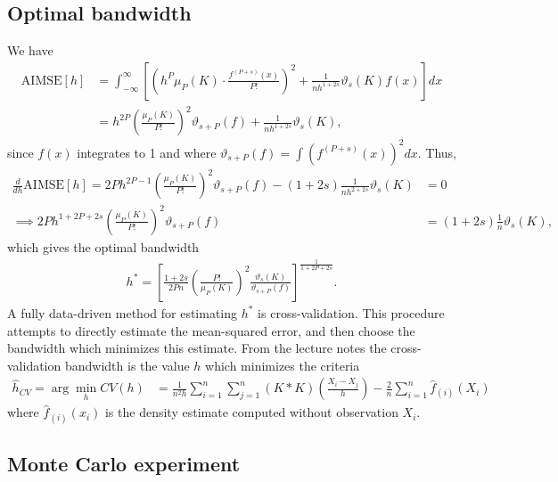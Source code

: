 \documentclass[12pt]{article}
\begin{document}
\newpage

\subsection{Optimal bandwidth}
We have
\begin{align*}
\text{AIMSE} [h] &= \int_{-\infty}^{\infty} \left[\left(h^P \mu_P(K) \cdot \frac{f^{(P+s)}(x)}{P!}\right)^2+\frac{1}{nh^{1+2s}}\vartheta_s(K)f(x)\right]dx\\
&= h^{2P}\left(\frac{\mu_P(K)}{P!}\right)^2\vartheta_{s+P}(f) + \frac{1}{nh^{1+2s}}\vartheta_s(K),
\end{align*}
since $f(x)$ integrates to 1 and where $\vartheta_{s+P}(f) = \int (f^{(P+s)}(x))^2dx$. Thus,
\begin{align*}
\frac{d}{dh}\text{AIMSE} [h] = 2Ph^{2P-1}\left(\frac{\mu_P(K)}{P!}\right)^2\vartheta_{s+P}(f) - (1+2s)\frac{1}{nh^{2+2s}}\vartheta_s(K)&=0\\
\implies 2Ph^{1+2P+2s}\left(\frac{\mu_P(K)}{P!}\right)^2\vartheta_{s+P}(f)  &=(1+2s)\frac{1}{n}\vartheta_s(K),
\end{align*}
which gives the optimal bandwidth
\begin{align*}
h^* = \left[\frac{1+2s}{2Pn}\left(\frac{P!}{\mu_P(K)}\right)^2\frac{\vartheta_s(K)}{\vartheta_{s+P}(f)}\right]^{\frac{1}{1+2P+2s}}.
\end{align*}
A fully data-driven method for estimating $h^*$ is cross-validation. This procedure attempts to directly estimate the mean-squared error, and then choose the bandwidth which minimizes this estimate. From the lecture notes the cross-validation bandwidth is the value $h$ which minimizes the criteria
\begin{align*}
\hat h_{CV} = \arg \min_{h} CV(h) &= \frac{1}{n^2h} \sum_{i=1}^n \sum_{j=1}^n (K*K) \left(\frac{X_i - X_j}{h}\right) - \frac{2}{n}\sum_{i=1}^n \hat f_{(i)}(X_i)
\end{align*}
where $ \hat f_{(i)}(x_i)$ is the density estimate computed without observation $X_i$.

\subsection{Monte Carlo experiment}
\end{document}
